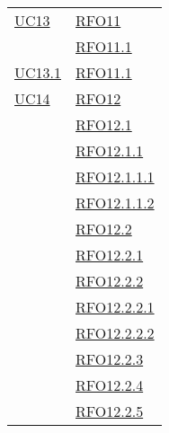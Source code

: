 \begin{longtable}{|>{\centering}m{5cm}|m{5cm}<{\centering}|}
\hyperlink{UC13}{UC13} & \hyperlink{RFO11}{RFO11}\\
& \hyperlink{RFO11.1}{RFO11.1}\\\hline
\hyperlink{UC13.1}{UC13.1} & \hyperlink{RFO11.1}{RFO11.1}\\\hline
\hyperlink{UC14}{UC14} & \hyperlink{RFO12}{RFO12}\\
& \hyperlink{RFO12.1}{RFO12.1}\\
& \hyperlink{RFO12.1.1}{RFO12.1.1}\\
& \hyperlink{RFO12.1.1.1}{RFO12.1.1.1}\\
& \hyperlink{RFO12.1.1.2}{RFO12.1.1.2}\\
& \hyperlink{RFO12.2}{RFO12.2}\\
& \hyperlink{RFO12.2.1}{RFO12.2.1}\\
& \hyperlink{RFO12.2.2}{RFO12.2.2}\\
& \hyperlink{RFO12.2.2.1}{RFO12.2.2.1}\\
& \hyperlink{RFO12.2.2.2}{RFO12.2.2.2}\\
& \hyperlink{RFO12.2.3}{RFO12.2.3}\\
& \hyperlink{RFO12.2.4}{RFO12.2.4}\\
& \hyperlink{RFO12.2.5}{RFO12.2.5}\\\hline


\end{longtable}